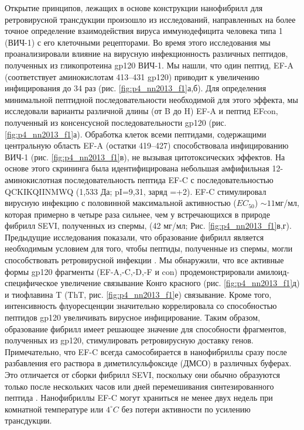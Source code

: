     Открытие принципов, лежащих в основе конструкции нанофибрилл для ретровирусной трансдукции произошло из исследований, направленных на более точное определение взаимодействия вируса иммунодефицита человека типа 1 (ВИЧ-1) с его клеточными рецепторами. Во время этого исследования мы проанализировали влияние на вирусную инфекционность различных пептидов, полученных из гликопротеина gp120 ВИЧ-1. Мы нашли, что один пептид, EF-A (соответствует аминокислотам 413–431 gp120) приводит к увеличению инфицирования  до 34 раз (рис. \ref{fig:p4_nn2013_f1}а,б). Для определения минимальной пептидной последовательности необходимой для этого эффекта, мы исследовали варианты различной длины (от B до H) EF-A и пептид EFcon, полученный из консенсусной последовательности gp120  (рис. \ref{fig:p4_nn2013_f1}а). Обработка клеток всеми пептидами, содержащими центральную область EF-A (остатки 419–427) способствовала инфицированию ВИЧ-1 (рис. \ref{fig:p4_nn2013_f1}в), не вызывая цитотоксических эффектов. На основе этого скрининга была идентифицирована небольшая амфифильная 12-аминокислотная последовательность пептида EF-C с последовательностью QCKIKQIINMWQ (1,533 Да; pI=9,31, заряд =+2). EF-C стимулировал вирусную инфекцию с половинной максимальной активностью ($EC_{50}$) $\sim11 $мг/мл, которая примерно в четыре раза сильнее, чем у встречающихся в природе фибрилл SEVI, полученных из спермы,  (42 мг/мл; Рис. \ref{fig:p4_nn2013_f1}в,г). Предыдущие исследования показали, что образование фибрилл является необходимым условием для того, чтобы пептиды, полученные из спермы, могли способствовать ретровирусной инфекции \cite{munch_semen-derived_2007,roan_peptides_2011,arnold_naturally_2012}. Мы обнаружили, что все активные формы gp120 фрагменты (EF-A,-C,-D,-F и con) продемонстрировали амилоид-специфическое увеличение связывание Конго красного (рис. \ref{fig:p4_nn2013_f1}д) и тиофлавина T (ThT, рис. \ref{fig:p4_nn2013_f1}е) связывание. Кроме того, интенсивность флуоресценции значительно коррелировала со способностью пептидов gp120 увеличивать вирусное инфицирование. Таким образом, образование фибрилл имеет решающее значение для способности фрагментов, полученных из gp120, стимулировать ретровирусную доставку генов. Примечательно, что EF-C всегда самособирается в нанофибриллы сразу после разбавления его раствора в диметилсульфоксиде (ДМСО) в различных буферах. Это отличается от сборки фибрилл SEVI, поскольку они обычно образуются только после нескольких часов или дней перемешивания синтезированного пептида \cite{munch_semen-derived_2007,roan_cationic_2009,kim_semen-mediated_2010,wurm_improved_2011}. Нанофибриллы EF-C могут храниться не менее двух недель при комнатной температуре или $4^{\circ}C$ без потери активности по усилению трансдукции.
    
